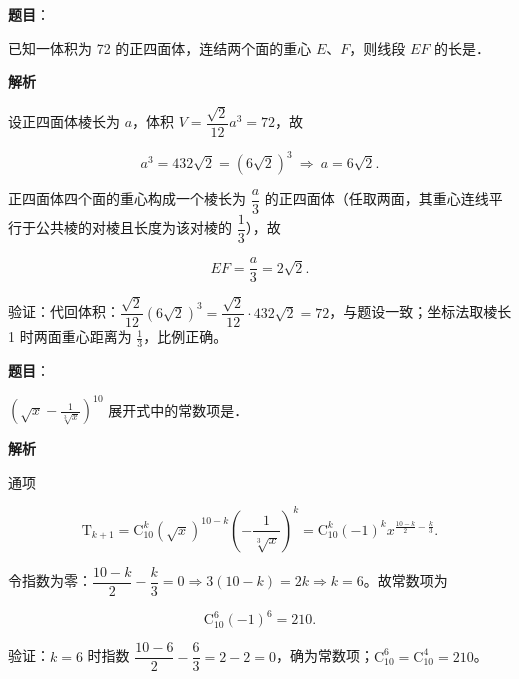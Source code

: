 \begin{answer}

\textbf{题目}：

已知一体积为 72 的正四面体，连结两个面的重心 $E$、$F$，则线段 $EF$ 的长是\gkblank{}．

\textbf{解析}

设正四面体棱长为 $a$，体积 $V=\dfrac{\sqrt2}{12}a^3=72$，故

\nopagebreak[4]
\[a^3=432\sqrt2=(6\sqrt2)^3\ \Longrightarrow\ a=6\sqrt2 .\]

正四面体四个面的重心构成一个棱长为 $\dfrac a3$ 的正四面体（任取两面，其重心连线平行于公共棱的对棱且长度为该对棱的 $\dfrac13$），故

\nopagebreak[4]
\[EF=\frac a3=2\sqrt2 .\]

验证：代回体积：$\dfrac{\sqrt2}{12}(6\sqrt2)^3=\dfrac{\sqrt2}{12}\cdot432\sqrt2=72$，与题设一致；坐标法取棱长 1 时两面重心距离为 $\tfrac13$，比例正确。


\par\medskip

\end{answer}
\begin{answer}

\textbf{题目}：

$\left(\sqrt{x} - \frac{1}{\sqrt[3]{x}}\right)^{10}$ 展开式中的常数项是\gkblank{}．

\textbf{解析}

通项

\nopagebreak[4]
\[\mathrm T_{k+1}=\mathrm C_{10}^k(\sqrt x)^{10-k}\left(-\frac{1}{\sqrt[3]x}\right)^{k}=\mathrm C_{10}^k(-1)^k x^{\frac{10-k}{2}-\frac k3}.\]

令指数为零：$\dfrac{10-k}{2}-\dfrac k3=0\Rightarrow3(10-k)=2k\Rightarrow k=6$。故常数项为

\nopagebreak[4]
\[\mathrm C_{10}^6(-1)^6=210 .\]

验证：$k=6$ 时指数 $\dfrac{10-6}{2}-\dfrac63=2-2=0$，确为常数项；$\mathrm C_{10}^6=\mathrm C_{10}^4=210$。


\par\medskip

\end{answer}
